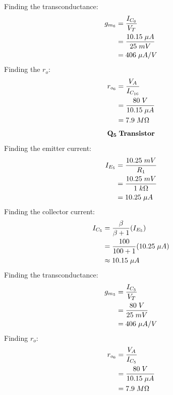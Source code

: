 \documentclass{article}
\begin{document}
	Finding the transconductance:
	\begin{align*}
		g_{m_{6}} &= \frac{I_{C_6}}{V_T}\\
		&= \frac{10.15 \hspace{1mm} \mu A}{25 \hspace{1mm} mV}\\
		&= 406 \hspace{1mm} \mu A/V
	\end{align*}
	Finding the $r_o$:
	\begin{align*}
		r_{o_6} &= \frac{V_A}{I_{C_{16}}}\\
		&= \frac{80 \hspace{1mm} V}{10.15 \hspace{1mm} \mu A}\\
		&= 7.9 \hspace{1mm} M\Omega
	\end{align*}
	\pagebreak
	\begin{align*}
		\mathbf{Q_{5}} \hspace{1mm} \textbf{Transistor}
	\end{align*}
	Finding the emitter current:
	\begin{align*}
		I_{E_5} &= \frac{10.25 \hspace{1mm} mV}{R_1}\\
		&= \frac{10.25 \hspace{1mm} mV}{1 \hspace{1mm} k\Omega}\\
		&= 10.25 \hspace{1mm} \mu A
	\end{align*}
	Finding the collector current:
	\begin{align*}
		I_{C_5} &= \frac{\beta}{\beta + 1} (I_{E_5})\\
		&= \frac{100}{100 + 1} (10.25 \hspace{1mm} \mu A)\\
		&\approx 10.15 \hspace{1mm} \mu A
	\end{align*}
	Finding the transconductance:
	\begin{align*}
		g_{m_5} &= \frac{I_{C_5}}{V_T}\\
		&= \frac{80 \hspace{1mm} V}{25 \hspace{1mm} mV}\\
		&= 406 \hspace{1mm} \mu A/V
	\end{align*}
	Finding $r_o$:
	\begin{align*}
		r_{o_6} &= \frac{V_A}{I_{C_{5}}}\\
		&= \frac{80 \hspace{1mm} V}{10.15 \hspace{1mm} \mu A}\\
		&= 7.9 \hspace{1mm} M\Omega
	\end{align*}
\end{document}
